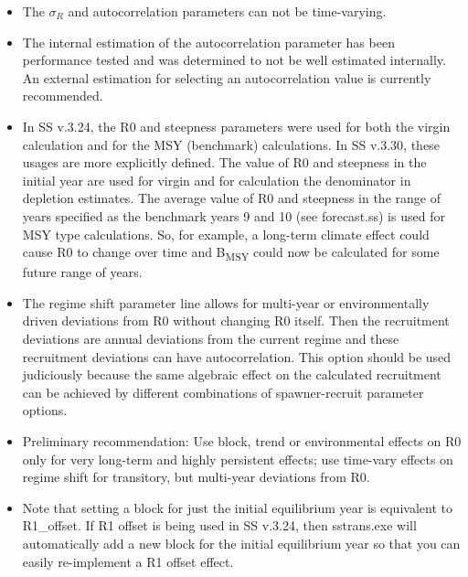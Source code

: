 \begin{itemize}
	
	\item The $\sigma_R$ and autocorrelation parameters can not be time-varying. 
	
	\item The internal estimation of the autocorrelation parameter has been performance tested \citep{johnson_can_2016} and was determined to not be well estimated internally. An external estimation for selecting an autocorrelation value is currently recommended. 
		
	\item In SS v.3.24, the R0 and steepness parameters were used for both the virgin calculation and for the MSY (benchmark) calculations. In SS v.3.30, these usages are more explicitly defined. The value of R0 and steepness in the initial year are used for virgin and for calculation the denominator in depletion estimates. The average value of R0 and steepness in the range of years specified as the benchmark years 9 and 10 (see forecast.ss) is used for MSY type calculations. So, for example, a long-term climate effect could cause R0 to change over time and B\textsubscript{MSY} could now be calculated for some future range of years.
	
	\item The regime shift parameter line allows for multi-year or environmentally driven deviations from R0 without changing R0 itself. Then the recruitment deviations are annual deviations from the current regime and these recruitment deviations can have autocorrelation. This option should be used judiciously because the same algebraic effect on the calculated recruitment can be achieved by different combinations of spawner-recruit parameter options.

	\item Preliminary recommendation: Use block, trend or environmental effects on R0 only for very long-term and highly persistent effects; use time-vary effects on regime shift for transitory, but multi-year deviations from R0.	

	\item Note that setting a block for just the initial equilibrium year is equivalent to R1\_offset. If R1 offset is being used in SS v.3.24, then sstrans.exe will automatically add a new block for the initial equilibrium year so that you can easily re-implement a R1 offset effect.
\end{itemize}

